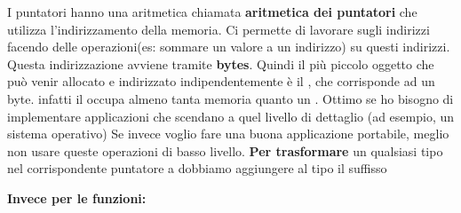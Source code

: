 I puntatori hanno una aritmetica chiamata \textbf{aritmetica dei puntatori} che utilizza l'indirizzamento della memoria. Ci permette di lavorare sugli indirizzi facendo delle operazioni(es: sommare un valore a un indirizzo) su questi indirizzi. Questa indirizzazione avviene tramite \textbf{bytes}.\newline\newline
Quindi il più piccolo oggetto che può venir allocato e
indirizzato indipendentemente è il , che corrisponde
ad un byte. infatti il  occupa almeno tanta memoria quanto un .\newline\newline
Ottimo se ho bisogno di implementare applicazioni che
scendano a quel livello di dettaglio (ad esempio, un
sistema operativo) \newline Se invece voglio fare una buona applicazione portabile,
meglio non usare queste operazioni di basso livello.\newline\newline\newline
\textbf{Per trasformare} un qualsiasi tipo  nel
corrispondente puntatore a  dobbiamo aggiungere al tipo
il suffisso \code{*}\newline\newline

\textbf{Invece per le funzioni:}

\newpage 
